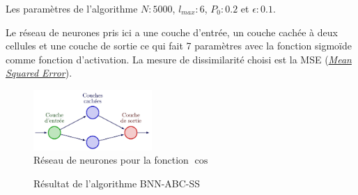 \documentclass[french,12pt]{article}
\begin{document}
Les paramètres de l'algorithme $N : 5000$, $l_{max} : 6$, $P_0 : 0.2$ et $\epsilon : 0.1$.

Le réseau de neurones pris ici a une couche d'entrée, un couche cachée à deux cellules et une couche de sortie ce qui
fait 7 paramètres avec la fonction sigmoïde comme fonction d'activation. La mesure de dissimilarité
choisi est la MSE (\href{https://en.wikipedia.org/wiki/Mean_squared_error}{\textit{Mean Squared Error}}).

\begin{figure}[H]
    \centering
    \includegraphics[width = 0.4\textwidth]{FNN/Images/fnnCos/fnnCos_page-0001.jpg}
    \caption[short]{Réseau de neurones pour la fonction $\cos$}
\end{figure}


\begin{figure}[H]
    \centering
    \caption[short]{Résultat de l'algorithme BNN-ABC-SS}
\end{figure}
\end{document}
